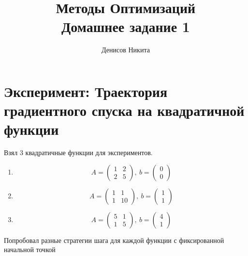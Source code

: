 \documentclass[12pt]{article}
\title{Методы Оптимизаций\\ Домашнее задание 1 }
\author{Денисов Никита}
\begin{document}
\maketitle

\section{Эксперимент: Траектория градиентного спуска на
квадратичной функции} %

Взял 3 квадратичные функции для экспериментов.

\begin{enumerate}


\item %

$$
A = 
\begin{pmatrix}
1 & 2 \\
2 & 5
\end{pmatrix},
\
b = 
\begin{pmatrix}
0 \\
0
\end{pmatrix}
$$

\item %

$$
A = 
\begin{pmatrix}
1 & 1 \\
1 & 10
\end{pmatrix},
\
b = 
\begin{pmatrix}
1 \\
1
\end{pmatrix}
$$

\item %

$$
A = 
\begin{pmatrix}
5 & 1 \\
1 & 5
\end{pmatrix},
\
b = 
\begin{pmatrix}
4 \\
1
\end{pmatrix}
$$

\end{enumerate}

Попробовал разные стратегии шага для каждой функции с фиксированной начальной точкой
\end{document}
